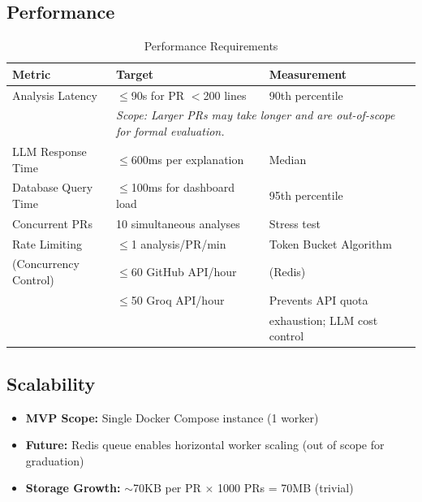 \documentclass[11pt,a4paper]{article}
\begin{document}
\subsection{Performance}

\begin{table}[h]
\centering
\begin{tabular}{p{4cm}p{3cm}p{4cm}}
\toprule
\textbf{Metric} & \textbf{Target} & \textbf{Measurement} \\
\midrule
Analysis Latency & $\leq$90s for PR $<$200 lines & 90th percentile \\
 & \multicolumn{2}{p{7cm}}{\textit{Scope: Larger PRs may take longer and are out-of-scope for formal evaluation.}} \\
\midrule
LLM Response Time & $\leq$600ms per explanation & Median \\
\midrule
Database Query Time & $\leq$100ms for dashboard load & 95th percentile \\
\midrule
Concurrent PRs & 10 simultaneous analyses & Stress test \\
\midrule
Rate Limiting & $\leq$1 analysis/PR/min & Token Bucket Algorithm \\
(Concurrency Control) & $\leq$60 GitHub API/hour & (Redis) \\
 & $\leq$50 Groq API/hour & Prevents API quota \\
 & & exhaustion; LLM cost control \\
\bottomrule
\end{tabular}
\caption{Performance Requirements}
\end{table}

\subsection{Scalability}
\begin{itemize}[leftmargin=*]
    \item \textbf{MVP Scope:} Single Docker Compose instance (1 worker)
    \item \textbf{Future:} Redis queue enables horizontal worker scaling (out of scope for graduation)
    \item \textbf{Storage Growth:} $\sim$70KB per PR $\times$ 1000 PRs = 70MB (trivial)
\end{itemize}
\end{document}
